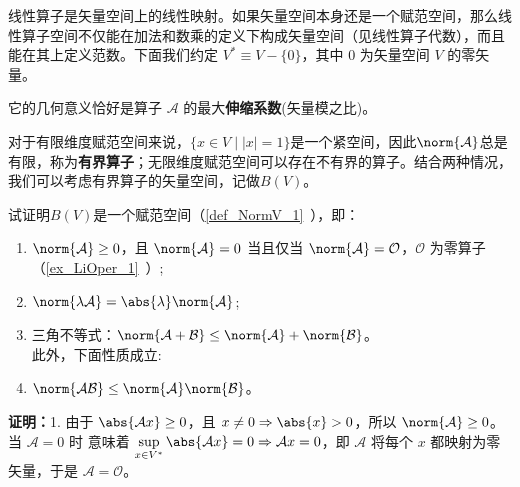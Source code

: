 

线性算子是矢量空间上的线性映射。如果矢量空间本身还是一个赋范空间，那么线性算子空间不仅能在加法和数乘的定义下构成矢量空间（见线性算子代数），而且能在其上定义范数。下面我们约定 $V^* \equiv V - \{0\}$，其中 $0$ 为矢量空间 $V$ 的零矢量。

它的几何意义恰好是算子 $\mathcal A$ 的最大\textbf{伸缩系数}(矢量模之比)。


对于有限维度赋范空间来说，$\{x \in V \mid |x| = 1\}$是一个紧空间，因此$\norm{\mathcal A}$总是有限，称为\textbf{有界算子}；无限维度赋范空间可以存在不有界的算子。结合两种情况，我们可以考虑有界算子的矢量空间，记做$B(V)$。

\begin{example}{}
试证明$B(V)$是一个赋范空间（\autoref{def_NormV_1}~），即：
\begin{enumerate}
\item $\norm{\mathcal A}\geq0$，且 $\norm{\mathcal A}=0$ 当且仅当 $\norm{\mathcal A}=\mathcal O$，$\mathcal O$ 为零算子（\autoref{ex_LiOper_1}~）;
\item $\norm{\lambda \mathcal A}=\abs{\lambda}\norm{\mathcal A}$;
\item 三角不等式：$\norm{\mathcal A+\mathcal B}\leq\norm{\mathcal A}+\norm{\mathcal B}$。\\
此外，下面性质成立:\\
\item $\norm{\mathcal{AB}}\leq{\norm{\mathcal A}}\norm{\mathcal B}$。
\end{enumerate}
\end{example}

\textbf{证明：}1. 由于 $\abs{\mathcal A x}\geq0$，且 $x\neq0\Rightarrow\abs{x}>0$，所以
$\norm{\mathcal A}\geq0$。当 $\mathcal A=0$ 时 意味着 $\sup\limits_{x\in{V^*}}\abs{\mathcal A x}=0\Rightarrow\mathcal A x=0$，即 $\mathcal A$ 将每个 $x$ 都映射为零矢量，于是 $\mathcal A=\mathcal O$。

